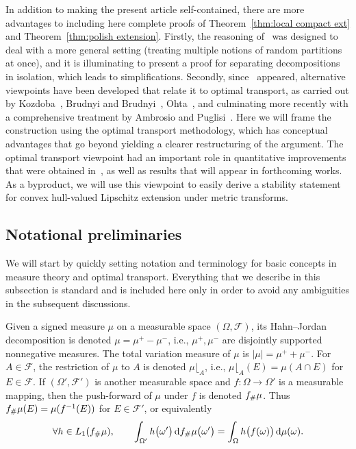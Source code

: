 \documentclass[11pt,reqno]{amsart}
\newcommand{\ud}[0]{\,\mathrm{d}}
\theoremstyle{remark}
\renewcommand{\1}{\mathbf 1}
\begin{document}
In addition to making the present article self-contained, there are more advantages to including here complete  proofs of Theorem~\ref{thm:local compact ext} and Theorem~\ref{thm:polish extension}. Firstly, the reasoning of~\cite{LN05} was designed to deal with a more general setting (treating multiple notions of random partitions at once), and it is illuminating to present a proof for separating decompositions in isolation, which leads to simplifications. Secondly, since~\cite{LN05} appeared, alternative viewpoints have been developed that relate it to optimal transport, as carried  out by Kozdoba~\cite{Koz05}, Brudnyi and Brudnyi~\cite{BB07-2}, Ohta~\cite{Oht09},  and culminating more recently with a comprehensive treatment by Ambrosio and Puglisi~\cite{AP20}. Here we will   frame the construction using the optimal transport methodology, which has conceptual advantages that go beyond yielding a  clearer restructuring of the argument. The optimal transport viewpoint had an important role in  quantitative improvements that were obtained in~\cite{NR17,Nao20-almost}, as well as  results that will appear in forthcoming works. As a byproduct, we will use this viewpoint  to easily derive a stability statement for convex hull-valued Lipschitz extension under metric transforms.






\subsection{Notational preliminaries}\label{sec:transport notation} We will start by quickly setting notation and terminology for basic concepts in measure theory and optimal transport. Everything that we describe in this subsection is  standard and is included here only in order to avoid any ambiguities in the subsequent discussions.

Given a signed measure $\mu$ on a measurable space $(\Omega,\mathscr{F})$, its Hahn--Jordan decomposition is denoted $\mu=\mu^+-\mu^-$, i.e., $\mu^+,\mu^-$ are  disjointly supported nonnegative measures. The total variation measure of $\mu$ is $|\mu|=\mu^++\mu^-$. For $A\in \mathscr{F}$, the restriction of $\mu$ to $A$ is denoted $\mu\lfloor_A$, i.e., $\mu\lfloor_A(E)=\mu(A\cap E)$ for  $E\in \mathscr{F}$. If $(\Omega',\mathscr{F}')$ is another measurable space and $f:\Omega\to \Omega'$ is a measurable mapping, then  the push-forward of $\mu$ under $f$ is denoted $f_{\bf \#}\mu$. Thus $f_{\bf \#}\mu(E)=\mu(f^{-1}(E))$ for $E\in \mathscr{F}'$, or equivalently $$\forall h\in L_1(f_{\bf \#}\mu),\qquad \int_{\Omega'}h\big(\omega'\big) \ud f_{\bf \#}\mu\big(\omega'\big)=\int_{\Omega} h\big(f(\omega)\big)\ud\mu(\omega).$$
\end{document}
